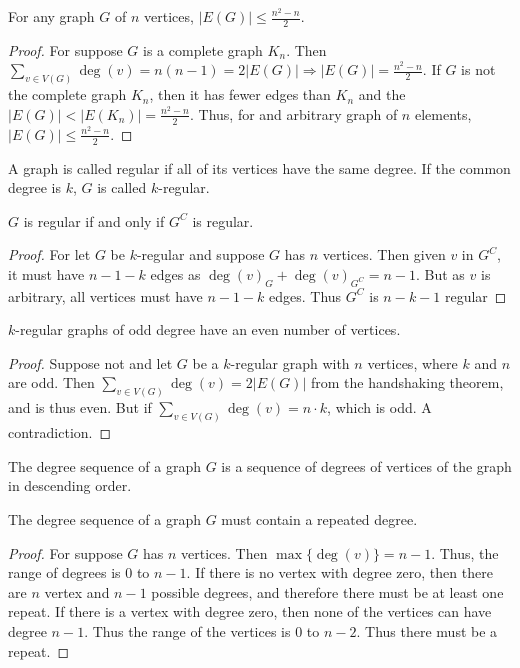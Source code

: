         \begin{theorem}
        For any graph $G$ of $n$ vertices, $|E(G)|\leq \frac{n^2-n}{2}$.
        \end{theorem}
        \begin{proof}
        For suppose $G$ is a complete graph $K_n$. Then $\sum_{v\in V(G)}\deg(v) = n(n-1) = 2|E(G)| \Rightarrow |E(G)| = \frac{n^2-n}{2}$. If $G$ is not the complete graph $K_n$, then it has fewer edges than $K_n$ and the $|E(G)| <|E(K_n)|= \frac{n^2-n}{2}$. Thus, for and arbitrary graph of $n$ elements, $|E(G)|\leq \frac{n^2-n}{2}$.
        \end{proof}
        \begin{definition}
        A graph is called regular if all of its vertices have the same degree. If the common degree is $k$, $G$ is called $k$-regular.
        \end{definition}
        \begin{theorem}
        $G$ is regular if and only if $G^C$ is regular. 
        \end{theorem}
        \begin{proof}
        For let $G$ be $k$-regular and suppose $G$ has $n$ vertices. Then given $v$ in $G^C$, it must have $n-1-k$ edges as $\deg(v)_G + \deg(v)_{G^C} = n-1$. But as $v$ is arbitrary, all vertices must have $n-1-k$ edges. Thus $G^C$ is $n-k-1$ regular
        \end{proof}
        \begin{theorem}
        $k$-regular graphs of odd degree have an even number of vertices.
        \end{theorem}
        \begin{proof}
        Suppose not and let $G$ be a $k$-regular graph with $n$ vertices, where $k$ and $n$ are odd. Then $\sum_{v\in V(G)}\deg(v) = 2|E(G)|$ from the handshaking theorem, and is thus even. But if $\sum_{v\in V(G)}\deg(v) = n\cdot k$, which is odd. A contradiction.
        \end{proof}
        \begin{definition}
        The degree sequence of a graph $G$ is a sequence of degrees of vertices of the graph in descending order.
        \end{definition}
        \begin{theorem}
        The degree sequence of a graph $G$ must contain a repeated degree.
        \end{theorem}
        \begin{proof}
        For suppose $G$ has $n$ vertices. Then $\max\{\deg(v)\} = n-1$. Thus, the range of degrees is $0$ to $n-1$. If there is no vertex with degree zero, then there are $n$ vertex and $n-1$ possible degrees, and therefore there must be at least one repeat. If there is a vertex with degree zero, then none of the vertices can have degree $n-1$. Thus the range of the vertices is $0$ to $n-2$. Thus there must be a repeat. 
        \end{proof}
